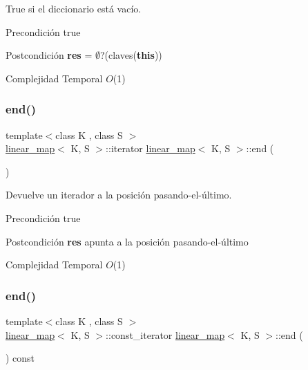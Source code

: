 True si el diccionario está vacío. 

\begin{DoxyPrecond}{Precondición}
true 
\end{DoxyPrecond}
\begin{DoxyPostcond}{Postcondición}
{\bfseries res} = $\emptyset$?(claves({\bfseries this}))
\end{DoxyPostcond}

\begin{DoxyDescription}
\item[Complejidad Temporal]$O$(1)
\end{DoxyDescription}\mbox{\label{classlinear__map_a29f90bee46581029b6ce496d4ea46683}} 
\subsubsection{\texorpdfstring{end()}{end()}\hspace{0.1cm}{\footnotesize\ttfamily [1/2]}}
{\footnotesize\ttfamily template$<$class K , class S $>$ \\
\mbox{\hyperlink{classlinear__map}{linear\+\_\+map}}$<$ K, S $>$\+::iterator \mbox{\hyperlink{classlinear__map}{linear\+\_\+map}}$<$ K, S $>$\+::end (\begin{DoxyParamCaption}{ }\end{DoxyParamCaption})}



Devuelve un iterador a la posición pasando-\/el-\/último. 

\begin{DoxyPrecond}{Precondición}
true 
\end{DoxyPrecond}
\begin{DoxyPostcond}{Postcondición}
{\bfseries res} apunta a la posición pasando-\/el-\/último
\end{DoxyPostcond}

\begin{DoxyDescription}
\item[Complejidad Temporal]$O$(1)
\end{DoxyDescription}\mbox{\label{classlinear__map_a20a63149ca91f200c2ff3ea25bd0ad97}} 
\subsubsection{\texorpdfstring{end()}{end()}\hspace{0.1cm}{\footnotesize\ttfamily [2/2]}}
{\footnotesize\ttfamily template$<$class K , class S $>$ \\
\mbox{\hyperlink{classlinear__map}{linear\+\_\+map}}$<$ K, S $>$\+::const\+\_\+iterator \mbox{\hyperlink{classlinear__map}{linear\+\_\+map}}$<$ K, S $>$\+::end (\begin{DoxyParamCaption}{ }\end{DoxyParamCaption}) const}



